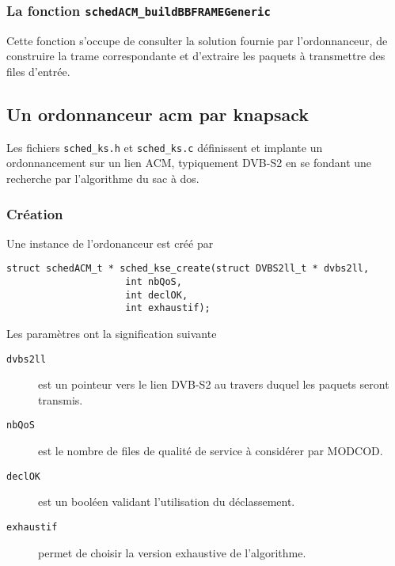 \documentclass{article}
\begin{document}
%
\subsubsection{La fonction {\tt schedACM\_buildBBFRAMEGeneric}}

   Cette fonction s'occupe de consulter la solution fournie par
l'ordonnanceur, de construire la trame correspondante et d'extraire
les paquets à transmettre des files d'entrée.

%
\subsection{Un ordonnanceur {\sc acm} par knapsack}

   Les fichiers {\tt sched\_ks.h} et {\tt sched\_ks.c} définissent et
implante un ordonnancement sur un lien ACM, typiquement DVB-S2 en se
fondant une recherche par l'algorithme du sac à dos.

%
\subsubsection{Création}

   Une instance de l'ordonanceur est créé par 

\begin{verbatim}
struct schedACM_t * sched_kse_create(struct DVBS2ll_t * dvbs2ll,
				     int nbQoS,
				     int declOK,
				     int exhaustif);
\end{verbatim}

   Les paramètres ont la signification suivante

\begin{description}
   \item[{\tt dvbs2ll}] est un pointeur vers le lien  DVB-S2 au
     travers duquel les paquets seront transmis.
   \item[{\tt nbQoS}] est le nombre de files de qualité de service à
     considérer par MODCOD.
   \item[{\tt declOK}] est un booléen validant l'utilisation du déclassement.
   \item[{\tt exhaustif}] permet de choisir la version exhaustive de
     l'algorithme. 
\end{description}
\end{document}
